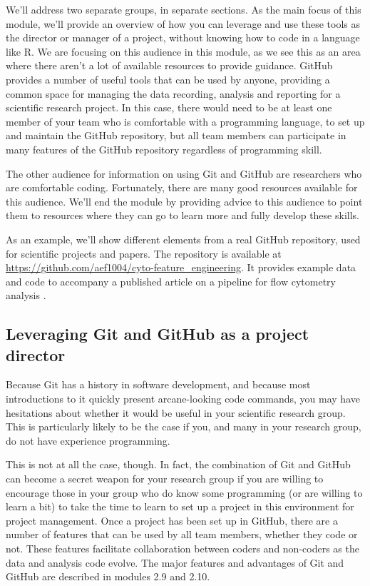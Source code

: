 \documentclass[]{tufte-book}
\begin{document}
We'll address two separate groups, in separate sections. As the main focus of
this module, we'll provide an overview of how you can leverage and use these
tools as the director or manager of a project, without knowing how to code in a
language like R. We are focusing on this audience in this module, as we see this
as an area where there aren't a lot of available resources to provide guidance.
GitHub provides a number of useful tools that can be used by anyone, providing a
common space for managing the data recording, analysis and reporting for a
scientific research project. In this case, there would need to be at least one
member of your team who is comfortable with a programming language, to set up
and maintain the GitHub repository, but all team members can participate in many
features of the GitHub repository regardless of programming skill.

The other audience for information on using Git and GitHub are researchers who
are comfortable coding. Fortunately, there are many good resources available for
this audience. We'll end the module by providing advice to this audience to
point them to resources where they can go to learn more and fully develop these
skills.

As an example, we'll show different elements from a real GitHub repository, used
for scientific projects and papers. The repository is available at
\url{https://github.com/aef1004/cyto-feature_engineering}. It provides example data
and code to accompany a published article on a pipeline for flow cytometry
analysis \citep{fox2020cyto}.

\subsection{Leveraging Git and GitHub as a project director}\label{leveraging-git-and-github-as-a-project-director}

Because Git has a history in software development, and because most
introductions to it quickly present arcane-looking code commands, you may have
hesitations about whether it would be useful in your scientific research group.
This is particularly likely to be the case if you, and many in your research
group, do not have experience programming.

This is not at all the case, though. In fact, the combination of Git and GitHub
can become a secret weapon for your research group if you are willing to
encourage those in your group who do know some programming (or are willing to
learn a bit) to take the time to learn to set up a project in this environment
for project management. Once a project has been set up in GitHub, there are a
number of features that can be used by all team members, whether they code or
not. These features facilitate collaboration between coders and non-coders as
the data and analysis code evolve. The major features and advantages of Git and
GitHub are described in modules 2.9 and 2.10.
\end{document}
